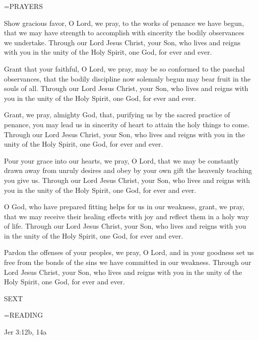 \hangindent=\parindent \small PRAYERS
\begin{description}[labelindent=\parindent, noitemsep, leftmargin=*]
\item [Friday after Ash Wednesday:] 	Show gracious favor, O Lord, we pray, to the works of penance we have begun, that we may have strength to accomplish with sincerity the bodily observances we undertake. Through our Lord Jesus Christ, your Son, who lives and reigns with you in the unity of the Holy Spirit, one God, for ever and ever.
\item [Week 1:] 	Grant that your faithful, O Lord, we pray, may be so conformed to the paschal observances, that the bodily discipline now solemnly begun may bear fruit in the souls of all. Through our Lord Jesus Christ, your Son, who lives and reigns with you in the unity of the Holy Spirit, one God, for ever and ever.
\item [Week 2:] 	Grant, we pray, almighty God, that, purifying us by the sacred practice of penance, you may lead us in sincerity of heart to attain the holy things to come. Through our Lord Jesus Christ, your Son, who lives and reigns with you in the unity of the Holy Spirit, one God, for ever and ever.
\item [Week 3:] 	Pour your grace into our hearts, we pray, O Lord, that we may be constantly drawn away from unruly desires and obey by your own gift the heavenly teaching you give us. Through our Lord Jesus Christ, your Son, who lives and reigns with you in the unity of the Holy Spirit, one God, for ever and ever.
\item [Week 4:] 	O God, who have prepared fitting helps for us in our weakness, grant, we pray, that we may receive their healing effects with joy and reflect them in a holy way of life. Through our Lord Jesus Christ, your Son, who lives and reigns with you in the unity of the Holy Spirit, one God, for ever and ever.
\item [Week 5:] 	Pardon the offenses of your peoples, we pray, O Lord, and in your goodness set us free from the bonds of the sins we have committed in our weakness. Through our Lord Jesus Christ, your Son, who lives and reigns with you in the unity of the Holy Spirit, one God, for ever and ever.
\end{description}

\begin{flushleft}\normalsize SEXT\\\end{flushleft}
\hangindent=\parindent \small READING
\begin{description}[labelindent=\parindent, leftmargin=*]
\item [Friday after Ash Wednesday \& Weeks 1-4:]     Jer 3:12b, 14a \textbf{    }
\end{description}


